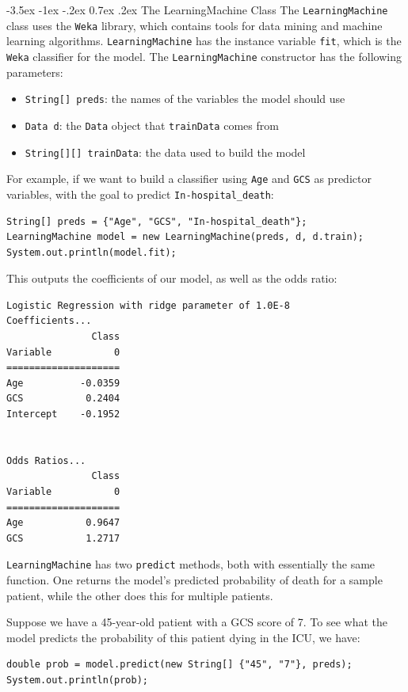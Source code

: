 \documentclass{article}
\makeatletter
\renewcommand{\section}{\@startsection{section}{1}{\z@}%
    {-3.5ex \@plus -1ex \@minus -.2ex}%
    {0.7ex \@plus.2ex}%
    {\normalfont\Large\bfseries}}
\makeatother
\begin{document}
\section{The LearningMachine Class}
The \verb|LearningMachine| class uses the \verb|Weka| library, which contains tools for data mining and machine learning algorithms. \verb|LearningMachine| has the instance variable \verb|fit|, which is the \verb|Weka| classifier for the model. The \verb|LearningMachine| constructor has the following parameters:

\begin{itemize}
    \item \verb|String[] preds|: the names of the variables the model should use
    \item \verb|Data d|: the \verb|Data| object that \verb|trainData| comes from
    \item \verb|String[][] trainData|: the data used to build the model
\end{itemize}  

For example, if we want to build a classifier using \verb|Age| and \verb|GCS| as predictor variables, with the goal to predict \verb|In-hospital_death|:

\begin{lstlisting}
String[] preds = {"Age", "GCS", "In-hospital_death"};
LearningMachine model = new LearningMachine(preds, d, d.train);
System.out.println(model.fit);
\end{lstlisting}

This outputs the coefficients of our model, as well as the odds ratio:
\begin{lstlisting}
Logistic Regression with ridge parameter of 1.0E-8
Coefficients...
               Class
Variable           0
====================
Age          -0.0359
GCS           0.2404
Intercept    -0.1952


Odds Ratios...
               Class
Variable           0
====================
Age           0.9647
GCS           1.2717
\end{lstlisting}

\verb|LearningMachine| has two \verb|predict| methods, both with essentially the same function. One returns the model's predicted probability of death for a sample patient, while the other does this for multiple patients.

Suppose we have a 45-year-old patient with a GCS score of 7. To see what the model predicts the probability of this patient dying in the ICU, we have:

\begin{lstlisting}
double prob = model.predict(new String[] {"45", "7"}, preds);
System.out.println(prob);
\end{lstlisting}
\end{document}
